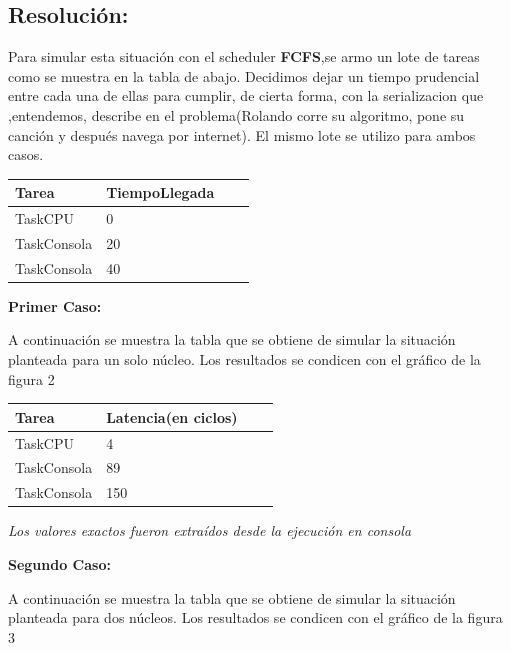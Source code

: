 \documentclass[10pt, a4paper]{article}
\begin{document}
\subsection{Resolución:}

Para simular esta situación con el scheduler \textbf{FCFS},se armo un lote de tareas como se muestra en la tabla de abajo. Decidimos dejar un tiempo prudencial entre cada una de ellas para cumplir, de cierta forma, con la serializacion que ,entendemos, describe en el problema(Rolando corre su algoritmo, pone su canción y después navega por internet).
El mismo lote se utilizo para ambos casos.
\begin{center}
\begin{tabular}{| l | l | l | l |}
    \hline
    Tarea & TiempoLlegada \\ \hline
    TaskCPU &	0 \\ \hline 
    TaskConsola & 20 \\ \hline
     TaskConsola & 40 \\ \hline

\end{tabular}
\end{center}
\begin{flushleft}
\textbf{Primer Caso:}\\
\end{flushleft}	
A continuación se muestra la tabla que se obtiene de simular la situación planteada para un solo núcleo. Los resultados se condicen con el gráfico de la figura 2
\begin{center}
\begin{tabular}{| l | l | l | l |}
    \hline
    Tarea & Latencia(en ciclos)\\ \hline
   TaskCPU &	4 \\ \hline 
   TaskConsola & 89 \\ \hline
TaskConsola & 150 \\ \hline
\end{tabular}
\end{center}

\begin{center}
  \textit{Los valores exactos fueron extraídos desde la ejecución en consola}
\end{center}

\begin{flushleft}
\textbf{Segundo Caso:}\\
\end{flushleft}

A continuación se muestra la tabla que se obtiene de simular la situación planteada para dos núcleos. Los resultados se condicen con el gráfico de la figura 3
\end{document}
